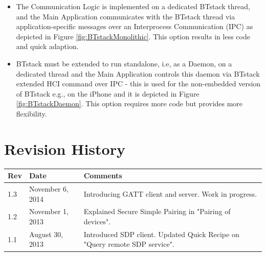 \documentclass[a4paper,titlepage,oneside,12pt]{amsart} %
\begin{document}
\begin{itemize}
\item The Communication Logic is implemented on a dedicated BTstack thread, and the Main Application communicates with the BTstack thread via application-specific messages over an Interprocess Communication (IPC) as depicted in Figure \ref{fig:BTstackMonolithic}. This option results in less code and quick adaption.
\item BTstack must be extended to run standalone, i.e, as a Daemon, on a dedicated thread and the Main Application controls this daemon via BTstack extended HCI command over IPC - this is used for the non-embedded version of BTstack e.g., on the iPhone and it is depicted in Figure \ref{fig:BTstackDaemon}. This option requires more code but provides more flexibility.
\end{itemize}


\pagebreak

\appendix
	    
	

\pagebreak

\section{Revision History}
\label{appendix:revision_history}

\begin{table}[!htbp]
\begin{tabular*}{\textwidth}{lp{3.5cm}p{8.5cm}}\toprule
Rev & Date & Comments\\ 
\midrule
1.3 & November 6, 2014 & Introducing GATT client and server. Work in progress.\\
1.2 & November 1, 2013 & Explained Secure Simple Pairing in "Pairing of devices".\\
1.1 & August 30, 2013 & Introduced SDP client. Updated Quick Recipe on "Query remote SDP service".\\
\bottomrule
\end{tabular*}
\end{table}

%
%
\end{document}
